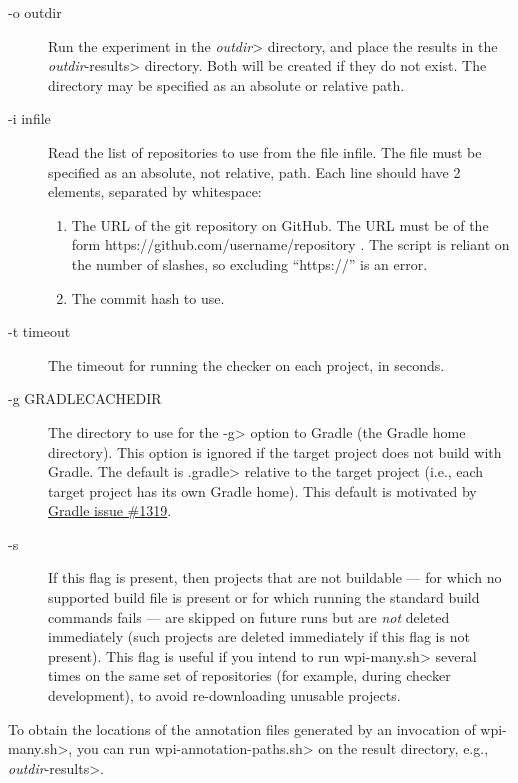 \begin{description}
\item[-o outdir]
  Run the experiment in the \<\emph{outdir}> directory, and place the results in
  the \<\emph{outdir}-results> directory. Both will be created if they do not
  exist.  The directory may be specified as an absolute or relative path.

\item[-i infile]
  Read the list of repositories to use from the file infile.
  The file must be specified as an absolute, not relative, path.
  Each line
  should have 2 elements, separated by whitespace:
  \begin{enumerate}
  \item
    The URL of the git repository on GitHub. The URL must be of the form
    https://github.com/username/repository .  The script is reliant on the
    number of slashes, so excluding ``https://'' is an error.
  \item The commit hash to use.
  \end{enumerate}

\item[-t timeout]
  The timeout for running the checker on each project, in seconds.

\item[-g GRADLECACHEDIR]
  The directory to use for the \<-g> option to Gradle (the Gradle home
  directory). This option is ignored if the target project does not
  build with Gradle. The default is \<.gradle> relative to the target
  project (i.e., each target project has its own Gradle home). This default
  is motivated by
  \href{https://github.com/gradle/gradle/issues/1319}{Gradle issue \#1319}.

\item[-s]
  If this flag is present, then projects that are not buildable --- for which
  no supported build file is present or for which running the standard build
  commands fails --- are skipped on future runs but are \emph{not} deleted immediately
  (such projects are deleted immediately if this flag is not present). This flag is useful
  if you intend to run \<wpi-many.sh> several times on the same set of repositories
  (for example, during checker development), to avoid re-downloading unusable projects.

\end{description}

To obtain the locations of the annotation files generated by an invocation of
\<wpi-many.sh>, you can run \<wpi-annotation-paths.sh> on the result directory,
e.g., \<\emph{outdir}-results>.

